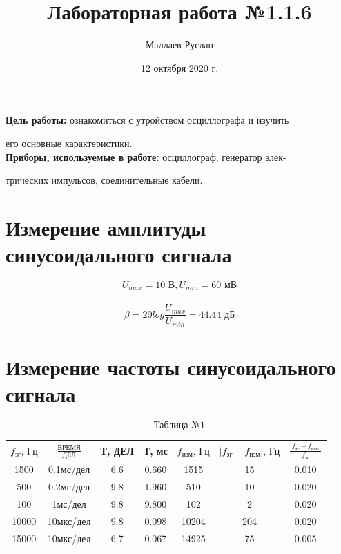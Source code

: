 \documentclass[a4paper,12pt]{article} %
\author{Маллаев Руслан}
\title{Лабораторная работа №1.1.6}
\date{12 октября 2020 г.}
\begin{document}

\maketitle
\newpage

\textbf{Цель работы:} ознакомиться с утройством осциллографа и изучить

его основные характеристики.\\

\textbf{Приборы, используемые в работе:} осциллограф, генератор элек-

трических импульсов, соединительные кабели.
\newpage




\section{Измерение амплитуды синусоидального сигнала}
\[U_{max} = 10\text{ В}, U_{min} = 60\text{ мВ}\]\\
\[\beta = 20log\frac{U_{max}}{U_{min}} = 44.44\text{ дБ}\]




\section{Измерение частоты синусоидального сигнала}
\[\text{Таблица №1}\]
\begin{tabular}[h]{|c|c|c|c|c|c|c|}
\hline
$f_{\text{зг}}\text{, Гц}$   & $\frac{\text{ВРЕМЯ}}{\text{ДЕЛ}}$ & Т, ДЕЛ & Т, мс  & $f_{\text{изм}}\text{, Гц}$  & $|f_{\text{зг}} - f_{\text{изм}}|\text{, Гц}$ & $\frac{|f_{\text{зг}} - f_{\text{изм}}|}{f_{\text{зг}}}$ \\ \hline
1500  & 0.1мс/дел & 6.6   & 0.660 & 1515  & 15       & 0.010    \\ \hline
500   & 0.2мс/дел & 9.8   & 1.960 & 510   & 10       & 0.020    \\ \hline
100   & 1мс/дел   & 9.8   & 9.800 & 102   & 2        & 0.020    \\ \hline
10000 & 10мкс/дел & 9.8   & 0.098 & 10204 & 204      & 0.020    \\ \hline
15000 & 10мкс/дел & 6.7   & 0.067 & 14925 & 75       & 0.005    \\ \hline
\end{tabular}
\end{document}

